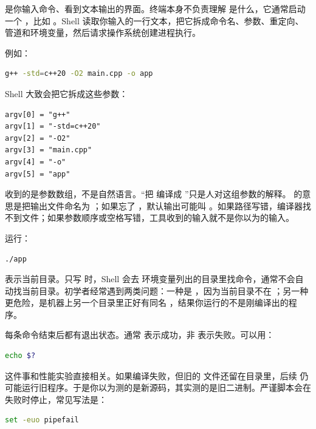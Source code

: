  是你输入命令、看到文本输出的界面。终端本身不负责理解  是什么，它通常启动一个 ，比如 。Shell 读取你输入的一行文本，把它拆成命令名、参数、重定向、管道和环境变量，然后请求操作系统创建进程执行。

例如：

\begin{lstlisting}[language=bash,caption={一行编译命令的拆解}]
g++ -std=c++20 -O2 main.cpp -o app
\end{lstlisting}

Shell 大致会把它拆成这些参数：

\begin{lstlisting}[numbers=none]
argv[0] = "g++"
argv[1] = "-std=c++20"
argv[2] = "-O2"
argv[3] = "main.cpp"
argv[4] = "-o"
argv[5] = "app"
\end{lstlisting}

 收到的是参数数组，不是自然语言。“把  编译成 ”只是人对这组参数的解释。 的意思是把输出文件命名为 ；如果忘了 ，默认输出可能叫 。如果路径写错，编译器找不到文件；如果参数顺序或空格写错，工具收到的输入就不是你以为的输入。

运行：

\begin{lstlisting}[language=bash,caption={运行当前目录下的程序}]
./app
\end{lstlisting}

 表示当前目录。只写  时，Shell 会去  环境变量列出的目录里找命令，通常不会自动找当前目录。初学者经常遇到两类问题：一种是 ，因为当前目录不在 ；另一种更危险，是机器上另一个目录里正好有同名 ，结果你运行的不是刚编译出的程序。

每条命令结束后都有退出状态。通常  表示成功，非  表示失败。可以用：

\begin{lstlisting}[language=bash,caption={查看上一条命令是否成功}]
echo $?
\end{lstlisting}

这件事和性能实验直接相关。如果编译失败，但旧的  文件还留在目录里，后续  仍可能运行旧程序。于是你以为测的是新源码，其实测的是旧二进制。严谨脚本会在失败时停止，常见写法是：

\begin{lstlisting}[language=bash,caption={脚本中尽早暴露失败}]
set -euo pipefail
\end{lstlisting}

